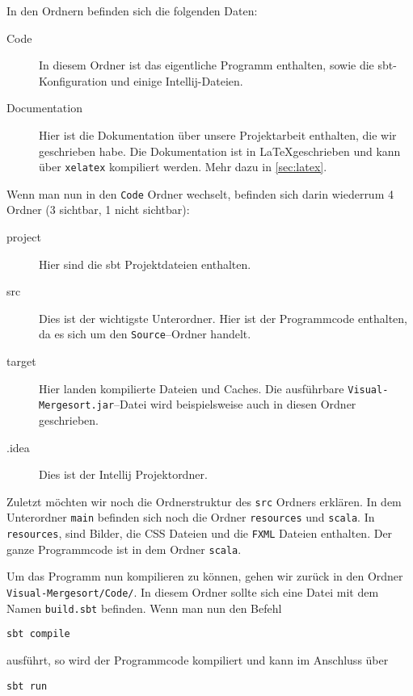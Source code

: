 In den Ordnern befinden sich die folgenden Daten:

\begin{description}
\item[Code] In diesem Ordner ist das eigentliche Programm enthalten, sowie die sbt-Konfiguration und einige Intellij-Dateien.
\item[Documentation] Hier ist die Dokumentation über unsere Projektarbeit enthalten, die wir geschrieben habe. Die Dokumentation ist in \LaTeX geschrieben und kann über \texttt{xelatex} kompiliert werden. Mehr dazu in \ref{sec:latex}.
\end{description}

Wenn man nun in den \texttt{Code} Ordner wechselt, befinden sich darin wiederrum 4 Ordner (3 sichtbar, 1 nicht sichtbar):

\begin{description}
\item[project] Hier sind die sbt Projektdateien enthalten.
\item[src] Dies ist der wichtigste Unterordner. Hier ist der Programmcode enthalten, da es sich um den \texttt{Source}--Ordner handelt.
\item[target] Hier landen kompilierte Dateien und Caches. Die ausführbare \texttt{Visual-Mergesort.jar}--Datei wird beispielsweise auch in diesen Ordner geschrieben.
\item[.idea] Dies ist der Intellij Projektordner.
\end{description}

Zuletzt möchten wir noch die Ordnerstruktur des \texttt{src} Ordners erklären. In dem Unterordner \texttt{main} befinden sich noch die Ordner \texttt{resources} und \texttt{scala}. In \texttt{resources}, sind Bilder, die CSS Dateien und die \texttt{FXML} Dateien enthalten. Der ganze Programmcode ist in dem Ordner \texttt{scala}.

Um das Programm nun kompilieren zu können, gehen wir zurück in den Ordner \texttt{Visual-Mergesort/Code/}. In diesem Ordner sollte sich eine Datei mit dem Namen \texttt{build.sbt} befinden. Wenn man nun den Befehl

\begin{verbatim}
sbt compile
\end{verbatim}

ausführt, so wird der Programmcode kompiliert und kann im Anschluss über

\begin{verbatim}
sbt run
\end{verbatim}

